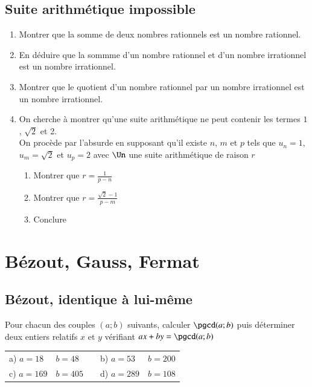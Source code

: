 \documentclass[oneside,12pt]{article}          %
\begin{document}
\subsection{Suite arithmétique impossible}
\begin{enumerate}
    \item Montrer que la somme de deux nombres rationnels est un nombre rationnel.
    \item En déduire que la sommme d'un nombre rationnel et d'un nombre irrationnel est un nombre irrationnel.
    \item Montrer que le quotient d'un nombre rationnel par un nombre irrationnel est un nombre irrationnel.
    \item On cherche à montrer qu'une suite arithmétique ne peut contenir les termes $1$, $\sqrt{2}$ et 2.\\
    On procède par l'absurde en supposant qu'il existe $n$, $m$ et $p$ tels que $u_n=1$, $u_m=\sqrt{2}$ et $u_p=2$ avec $\Un$ une suite arithmétique de raison $r$
    \begin{enumerate}
        \item Montrer que $r=\frac{1}{p-n}$
        \item Montrer que $r=\frac{\sqrt{2}-1}{p-m}$
        \item Conclure
    \end{enumerate}
\end{enumerate}



\section{Bézout, Gauss, Fermat}

\subsection{Bézout, identique à lui-même}
Pour chacun des couples $(a;b)$ suivants, calculer $\pgcd(a;b)$ puis déterminer deux entiers relatifs $x$ et $y$ vérifiant $ax+by=\pgcd(a;b)$

\begin{tabular}{p{20mm}p{35mm}|p{15mm}p{30mm}p{30mm}}
     a) $a=18$ & $b=48$ & & b) $a=53$ & $b=200$ \\
     c) $a=169$ & $b=405$ & & d) $a=289$ & $b=108$
\end{tabular}
\end{document}
